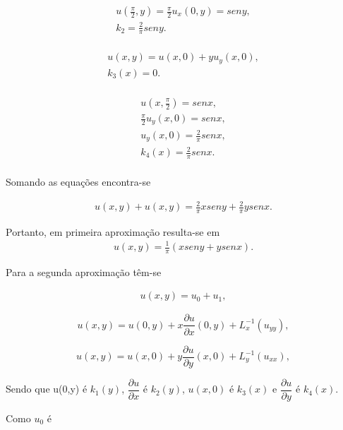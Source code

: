 \begin{gather}
u\left(\frac{\pi}{2},y\right) = \frac{\pi}{2}u_{x}(0,y) = seny, \nonumber\\
k_{2} = \frac{2}{\pi}seny. \nonumber\\
\end{gather}

\begin{gather}
u(x,y) = u(x,0) + yu_{y}(x,0),\nonumber\\
k_{3}(x) = 0.\nonumber\\
\end{gather}

\begin{gather}
u\left(x,\frac{\pi}{2}\right) = senx, \nonumber\\
\frac{\pi}{2}u_{y}(x,0) = senx,\nonumber\\
u_{y}(x,0) = \frac{2}{\pi}senx,\nonumber\\
k_{4}(x) = \frac{2}{\pi}senx.\nonumber\\
\end{gather}

Somando as equações encontra-se

\begin{gather}
u(x,y) + u(x,y) = \frac{2}{\pi}xseny + \frac{2}{\pi}ysenx.
\end{gather}

Portanto, em primeira aproximação resulta-se em
\begin{gather}
u(x,y) = \frac{1}{\pi}(xseny + ysenx).
\end{gather}

Para a  segunda aproximação têm-se 

\begin{gather}
u(x,y) = u_{0} + u_{1},
\end{gather}

\begin{equation*}
u(x,y) = u(0,y) + x\dfrac{\partial u}{\partial x}(0,y) + L_{x}^{-1}(u_{yy}),
\end{equation*}

\begin{equation*}
u(x,y) = u(x,0) + y\dfrac{\partial u}{\partial y}(x,0) + L_{y}^{-1}(u_{xx}),
\end{equation*}


Sendo que  u(0,y) é $k_{1}(y)$, $\dfrac{\partial u}{\partial x}$ é $k_{2}(y)$, $u(x,0)$ é $k_{3}(x)$ e $\dfrac{\partial u}{\partial y}$ é $k_{4}(x)$.

Como $u_{0}$ é

